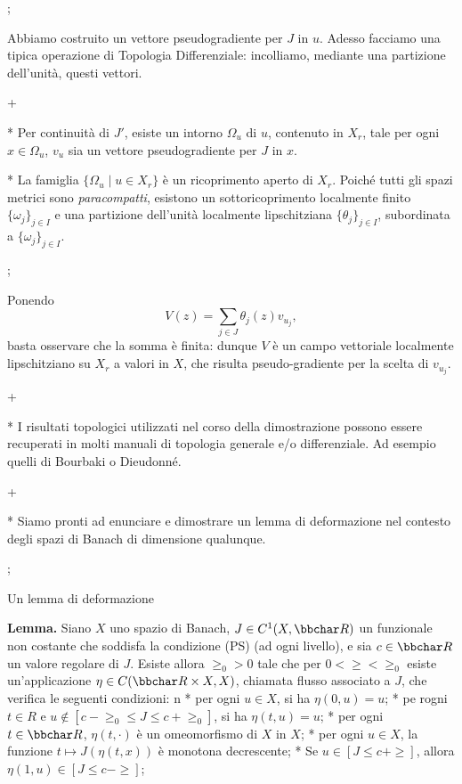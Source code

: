 \pg;

Abbiamo costruito un vettore pseudogradiente per $J$ in $u$. Adesso
facciamo una tipica operazione di Topologia Differenziale: incolliamo,
mediante una partizione dell'unit\`a, questi vettori.

\pg+

* Per continuit\`a di $J'$, esiste un intorno $\Omega_u$ di $u$,
  contenuto in $X_r$, tale per ogni $x \in \Omega_u$, $v_u$ sia un
  vettore pseudogradiente per $J$ in $x$.

* La famiglia $\{\Omega_u \mid u \in X_r\}$ \`e un ricoprimento aperto
  di $X_r$. Poich\'e tutti gli spazi metrici sono {\em paracompatti},
  esistono un sottoricoprimento localmente finito $\{\omega_j\}_{j \in
  I}$ e una partizione dell'unit\`a localmente lipschitziana
  $\{\theta_j\}_{j \in I}$, subordinata a $\{\omega_j\}_{j \in I}$.

\pg;

Ponendo
$$
V(z) = \sum_{j \in J} \theta_j(z) v_{u_j},
$$
basta osservare che la somma \`e finita: dunque $V$ \`e un campo
vettoriale localmente lipschitziano su $X_r$ a valori in $X$, che
risulta pseudo-gradiente per la scelta di $v_{u_j}$.

\pg+

* I risultati topologici utilizzati nel corso della dimostrazione
  possono essere recuperati in molti manuali di topologia generale e/o
  differenziale. Ad esempio quelli di Bourbaki o Dieudonn\'e.

\pg+

* Siamo pronti ad enunciare e dimostrare un lemma di deformazione nel
  contesto degli spazi di Banach di dimensione qualunque.

\pg;

\sec Un lemma di deformazione

{\bf Lemma.} Siano $X$ uno spazio di Banach, $J \in C^1(X,\R)$ un
funzionale non costante che soddisfa la condizione (PS) (ad ogni
livello), e sia $c \in \R$ un valore regolare di $J$. Esiste allora
$\ge_0>0$ tale che per $0<\ge<\ge_0$ esiste un'applicazione $\eta \in
C(\R \times X,X)$, chiamata flusso associato a $J$, che verifica le
seguenti condizioni:
\begitems
\style n
* per ogni $u \in X$, si ha $\eta(0,u)=u$;
* pe rogni $t \in R$ e $u \notin [c-\ge_0\leq J \leq c+\ge_0]$, si ha
$\eta(t,u) = u$;
* per ogni $t \in \R$, $\eta(t,\cdot)$ \`e un omeomorfismo di $X$ in
$X$;
* per ogni $u \in X$, la funzione $t \mapsto J(\eta(t,x))$ \`e
monotona decrescente;
* Se $u \in [J \leq c+\ge]$, allora $\eta(1,u) \in [J \leq c-\ge]$;
\enditems

